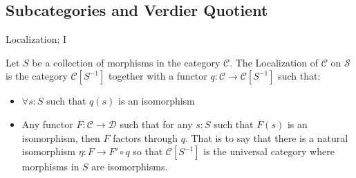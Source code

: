 \documentclass{beamer}
\begin{document}
        \subsection{Subcategories and Verdier Quotient}
            \begin{frame}{Localization; I}
                \begin{definition}[Localization]
                    Let $S$ be a collection of morphisms in the category $\mathcal{C}$. The Localization of $\mathcal{C}$ on $\mathcal{S}$ is the category $\mathcal{C}[S^{-1}]$ together with a functor $q:\mathcal{C}\rightarrow \mathcal{C}[S^{-1}]$ such that:
                    \begin{itemize}
                        \item $\forall s:S$ such that $q(s)$ is an isomorphism
                        \item Any functor $F:\mathcal{C}\rightarrow\mathcal{D}$ such that for any $s:S$ such that $F(s)$ is an isomorphism, then $F$ factors through $q$. That is to say that there is a natural isomorphism $\eta : F\rightarrow F'\circ q$ so that $\mathcal{C}[S^{-1}]$ is the universal category where morphisms in $S$ are isomorphisms.
                    \end{itemize}
                    \begin{center}
                    \end{center}
                \end{definition}
            \end{frame}
\end{document}
